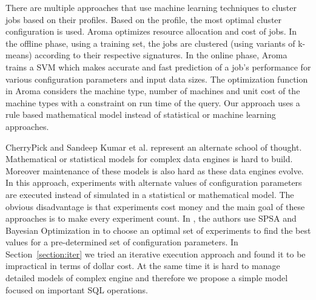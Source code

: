 There are multiple approaches \cite{wu2013self} \cite{lama2012aroma} that use machine learning techniques
to cluster jobs based on their profiles. Based on the profile, the most optimal cluster configuration is
used. Aroma \cite{lama2012aroma} optimizes resource allocation and cost of jobs. In
the offline phase, using a training set, the jobs are clustered
(using variants of k-means) according to their respective signatures.
In the online phase, Aroma trains a SVM which makes
accurate and fast prediction of a job's performance for various
configuration parameters and input data sizes. The optimization function in Aroma considers
the machine type, number of machines and unit cost of the machine types with a constraint on
run time of the query. Our approach uses a rule based mathematical model instead of statistical or machine learning approaches. 
 
CherryPick\cite{LiMinZeng} and Sandeep Kumar et al.\cite{KumarPLPGB16} represent an alternate school of thought.
Mathematical or statistical models for complex data engines is hard to build. Moreover maintenance of these models 
is also hard as these data engines evolve. In this approach, experiments
with alternate values of configuration parameters are executed instead of simulated in a 
statistical or mathematical model. The obvious disadvantage is that experiments cost money and the main 
goal of these approaches is to make every experiment count. In \cite{KumarPLPGB16}, the authors use SPSA and Bayesian Optimization in \cite{LiMinZeng} 
to choose an optimal set of experiments to find the best values for a pre-determined set of configuration parameters.
In Section~\ref{section:iter} we tried an iterative execution approach and found it to be impractical in terms of dollar cost. 
At the same time it is hard to manage detailed models of complex engine and therefore
we propose a simple model focused on important SQL operations.
  
